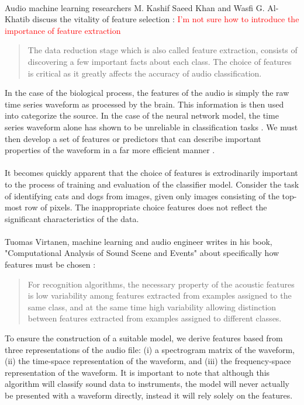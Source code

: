 \documentclass[12pt,letterpaper]{article}
\begin{document}
\paragraph*{}Audio machine learning researchers M. Kashif Saeed Khan and Wasfi G. Al-Khatib discuss the vitality of feature selection \cite{Khan}: \textcolor{red}{I'm not sure how to introduce the importance of feature extraction}
\begin{quote}
The data reduction stage which is also called feature extraction, consists of discovering a few important facts about each class. The choice of features is critical as it greatly affects the accuracy of audio classification. 
\end{quote}
In the case of the biological process, the features of the audio is simply the raw time series waveform as processed by the brain. This information is then used into categorize the source. In the case of the neural network model, the time series waveform alone has shown to be unreliable in classification tasks \cite{Virtanen}. We must then develop a set of features or predictors that can describe important properties of the waveform in a far more efficient manner \cite{Goodfellow,James}.

\paragraph*{}It becomes quickly apparent that the choice of features is extrodinarily important to the process of training and evaluation of the classifier model. Consider the task of identifying cats and dogs from images, given only images consisting of the top-most row of pixels. The inappropriate choice features does not reflect the significant characteristics of the data.

\paragraph*{}Tuomas Virtanen, machine learning and audio engineer writes in his book, "Computational Analysis of Sound Scene and Events" about specifically how features must be chosen \cite{Virtanen}:
\begin{quote}
For recognition algorithms, the necessary property of the acoustic features is low variability among features extracted from examples assigned to the same class, and at the same time high variability allowing distinction between features extracted from examples assigned to different classes.
\end{quote}
To ensure the construction of a suitable model, we derive features based from three representations of the audio file: (i) a spectrogram matrix of the waveform, (ii) the time-space representation of the waveform, and (iii) the frequency-space representation of the waveform. It is important to note that although this algorithm will classify sound data to instruments, the model will never actually be presented with a waveform directly, instead it will rely solely on the features.
\end{document}
